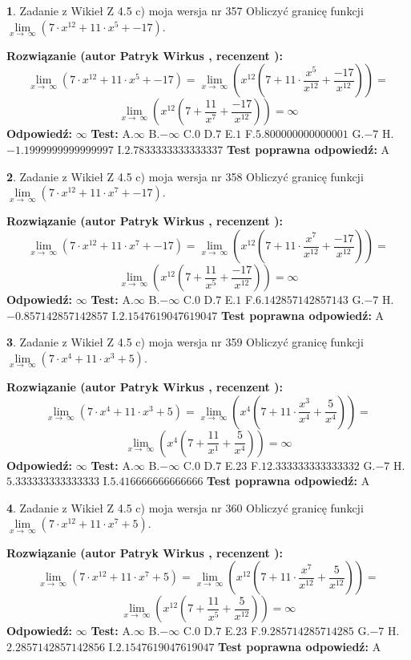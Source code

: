 \documentclass[12pt, a4paper]{article}
\theoremstyle{definition} %
\newtheorem{zad}{}
\newcommand{\zadStart}[1]{\begin{zad}#1\newline}
\newcommand{\zadStop}{\end{zad}}
\newcommand{\rozwStart}[2]{\noindent \textbf{Rozwiązanie (autor #1 , recenzent #2): }\newline}
\newcommand{\rozwStop}{\newline}
\newcommand{\odpStart}{\noindent \textbf{Odpowiedź:}\newline}
\newcommand{\odpStop}{\newline}
\newcommand{\testStart}{\noindent \textbf{Test:}\newline}
\newcommand{\testStop}{\newline}
\newcommand{\kluczStart}{\noindent \textbf{Test poprawna odpowiedź:}\newline}
\newcommand{\kluczStop}{\newline}
\begin{document}
\zadStart{Zadanie z Wikieł Z 4.5 c) moja wersja nr 357}
Obliczyć granicę funkcji  $\lim\limits_{x\to\ \infty}(7 \cdot x^{12}+11 \cdot x^{5}+-17)$.
\zadStop
\rozwStart{Patryk Wirkus}{}
$$\lim\limits_{x\to\ \infty}(7 \cdot x^{12}+11 \cdot x^{5}+-17) = \lim\limits_{x\to\ \infty}(x^{12}(7 +11 \cdot \frac{x^{5}}{x^{12}}+\frac{-17}{x^{12}})) =$$ $$\lim\limits_{x\to\ \infty}(x^{12}(7 +\frac{11}{x^{7}}+\frac{-17}{x^{12}})) =\infty$$
\rozwStop
\odpStart
$\infty$
\odpStop
\testStart
A.$\infty$ B.$-\infty$ C.$0$ D.$7$ E.$1$
F.$5.800000000000001$ G.$-7$
H.$-1.1999999999999997$
I.$2.7833333333333337$
\testStop
\kluczStart
A
\kluczStop



\zadStart{Zadanie z Wikieł Z 4.5 c) moja wersja nr 358}
Obliczyć granicę funkcji  $\lim\limits_{x\to\ \infty}(7 \cdot x^{12}+11 \cdot x^{7}+-17)$.
\zadStop
\rozwStart{Patryk Wirkus}{}
$$\lim\limits_{x\to\ \infty}(7 \cdot x^{12}+11 \cdot x^{7}+-17) = \lim\limits_{x\to\ \infty}(x^{12}(7 +11 \cdot \frac{x^{7}}{x^{12}}+\frac{-17}{x^{12}})) =$$ $$\lim\limits_{x\to\ \infty}(x^{12}(7 +\frac{11}{x^{5}}+\frac{-17}{x^{12}})) =\infty$$
\rozwStop
\odpStart
$\infty$
\odpStop
\testStart
A.$\infty$ B.$-\infty$ C.$0$ D.$7$ E.$1$
F.$6.142857142857143$ G.$-7$
H.$-0.857142857142857$
I.$2.1547619047619047$
\testStop
\kluczStart
A
\kluczStop



\zadStart{Zadanie z Wikieł Z 4.5 c) moja wersja nr 359}
Obliczyć granicę funkcji  $\lim\limits_{x\to\ \infty}(7 \cdot x^{4}+11 \cdot x^{3}+5)$.
\zadStop
\rozwStart{Patryk Wirkus}{}
$$\lim\limits_{x\to\ \infty}(7 \cdot x^{4}+11 \cdot x^{3}+5) = \lim\limits_{x\to\ \infty}(x^{4}(7 +11 \cdot \frac{x^{3}}{x^{4}}+\frac{5}{x^{4}})) =$$ $$\lim\limits_{x\to\ \infty}(x^{4}(7 +\frac{11}{x^{1}}+\frac{5}{x^{4}})) =\infty$$
\rozwStop
\odpStart
$\infty$
\odpStop
\testStart
A.$\infty$ B.$-\infty$ C.$0$ D.$7$ E.$23$
F.$12.333333333333332$ G.$-7$
H.$5.333333333333333$
I.$5.416666666666666$
\testStop
\kluczStart
A
\kluczStop



\zadStart{Zadanie z Wikieł Z 4.5 c) moja wersja nr 360}
Obliczyć granicę funkcji  $\lim\limits_{x\to\ \infty}(7 \cdot x^{12}+11 \cdot x^{7}+5)$.
\zadStop
\rozwStart{Patryk Wirkus}{}
$$\lim\limits_{x\to\ \infty}(7 \cdot x^{12}+11 \cdot x^{7}+5) = \lim\limits_{x\to\ \infty}(x^{12}(7 +11 \cdot \frac{x^{7}}{x^{12}}+\frac{5}{x^{12}})) =$$ $$\lim\limits_{x\to\ \infty}(x^{12}(7 +\frac{11}{x^{5}}+\frac{5}{x^{12}})) =\infty$$
\rozwStop
\odpStart
$\infty$
\odpStop
\testStart
A.$\infty$ B.$-\infty$ C.$0$ D.$7$ E.$23$
F.$9.285714285714285$ G.$-7$
H.$2.2857142857142856$
I.$2.1547619047619047$
\testStop
\kluczStart
A
\kluczStop
\end{document}

